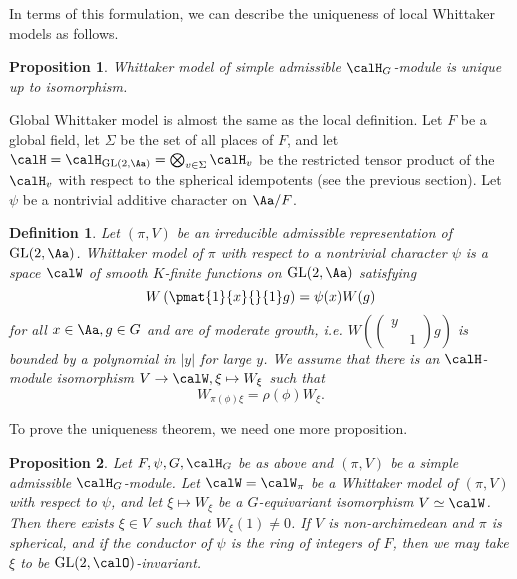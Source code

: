 \documentclass{article}
\newtheorem{definition}{Definition}[section]
\newcommand{\GL}{\mathrm{GL}}
\newcommand{\smat}[4]{\left(\begin{smallmatrix} #1 & #2 \\ #3 & #4 \end{smallmatrix}\right)}
\newtheorem{proposition}{Proposition}[section]
\begin{document}
In terms of this formulation, we can describe the uniqueness of local Whittaker models as follows. 
\begin{proposition}
Whittaker model of simple admissible $\calH_{G}$-module is unique up to isomorphism. 
\end{proposition}

Global Whittaker model is almost the same as the local definition. 
Let $F$ be a global field, let $\Sigma$ be the set of all places of $F$, and let $\calH = \calH_{\GL(2, \Aa)} = \bigotimes_{v\in \Sigma} \calH_{v}$ be the restricted tensor product of the $\calH_v$ with respect to the spherical idempotents (see the previous section). 
Let $\psi$ be a nontrivial additive character on $\Aa/F$. 
\begin{definition}
Let $(\pi, V)$ be an irreducible admissible representation of $\GL(2, \Aa)$. 
Whittaker model of $\pi$ with respect to a nontrivial character $\psi$  is a space $\calW$ of smooth $K$-finite functions on $\GL(2, \Aa)$ satisfying 
$$
W\left( \pmat{1}{x}{}{1} g\right) = \psi(x)W(g)
$$
for all $x\in \Aa, g\in G$ and are of moderate growth, i.e. $W\left( \smat{y}{}{}{1} g\right)$ is bounded by a polynomial in $|y|$ for large $y$. We assume that there is an $\calH$-module isomorphism $V \to \calW, \xi\mapsto W_{\xi}$ such that 
$$
W_{\pi(\phi)\xi} = \rho(\phi) W_{\xi}. 
$$
\end{definition}
To prove the uniqueness theorem, we need one more proposition. 
\begin{proposition}
Let $F, \psi, G, \calH_{G}$ be as above and $(\pi, V)$ be a simple admissible $\calH_{G}$-module. 
Let $\calW = \calW_{\pi}$ be a Whittaker model of $(\pi, V)$ with respect to $\psi$, and let $\xi\mapsto W_{\xi}$ be a $G$-equivariant isomorphism $V\simeq\calW$. 
Then there exists $\xi\in V$ such that $W_{\xi}(1) \neq 0$. 
If $V$ is non-archimedean and $\pi$ is spherical, and if the conductor of $\psi$ is the ring of integers of $F$, then we may take $\xi$ to be $\GL(2, \calO)$-invariant. 
\end{proposition}
\end{document}
